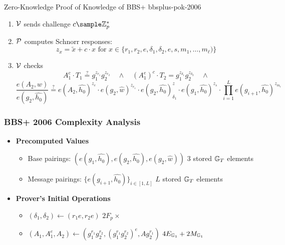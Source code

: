 {\begin{protocol}{\cite{hutchison_constant-size_2006} Zero-Knowledge Proof of Knowledge of BBS+ }{bbsplus-pok-2006}
\begin{enumerate}
\begin{itemize}
        \item  Send $(A_1, A_1^e, A_2, T_1, T_2, T_3)$ to $\Verifier$
                
        \end{itemize}

    \item $\Verifier$ sends challenge $c \sample \Z_p^*$\

    \item $\mathcal{P}$ computes Schnorr responses:
         \[
         z_x = \tilde{x} + c \cdot x \text{ for } x \in \{r_1, r_2, e, \delta_1, \delta_2, e, s, m_1,\ldots,m_{\ell})\}
         \]
 
    \item $\Verifier$ checks
    \[
    A_1^c \cdot T_1 \stackrel{?}{=} g_1^{z_{r_1}}g_2^{z_{r_2}} \quad \wedge \quad (A_1^e)^c \cdot T_2 = g_1^{{z}_{\delta_1}}g_2^{{z}_{\delta_2}} \quad \wedge
    \]
        \[
            \frac{e(A_2, \widehat{w})}{e(g_2, \widehat{h_0})} \stackrel{?}{=}  e(A_2, \hat{h_0})^{z_e} \cdot e(g_2, \hat{w})^{z_{r_1}} \cdot e(g_2, \hat{h_0})^z_{\delta_1} \cdot e(g_1, \hat{h_0})^{z_s} \cdot \prod_{i=1}^L e(g_{i+1}, \hat{h_0})^{z_{m_i}}
        \]
    \end{enumerate}
\end{protocol}

\newpage
\subsubsection{BBS+ 2006 Complexity Analysis}

\begin{itemize}
    \item \textbf{Precomputed Values}
    \begin{itemize}
        \item Base pairings: $(e(g_1, \hat{h_0}), e(g_2, \hat{h_0}), e(g_2, \hat{w}))$ \qquad $3$ stored $\mathbb{G}_T$ elements
        \item Message pairings: $\{e(g_{i+1}, \hat{h_0})\}_{i \in [1,L]}$ \qquad $L$ stored $\mathbb{G}_T$ elements
    \end{itemize}

    \item \textbf{Prover's Initial Operations}
    \begin{itemize}
        \item $(\delta_1, \delta_2) \gets (r_1e, r_2e)$ \qquad $2F_p\times$
        \item $(A_1, A_1^e, A_2) \gets (g_1^{r_1}g_2^{r_2}, (g_1^{r_1}g_2^{r_2})^e, Ag_2^{r_1})$ \qquad $4E_{\mathbb{G}_1} + 2M_{\mathbb{G}_1}$
    \end{itemize}
    

\end{itemize}}
